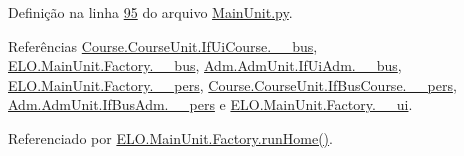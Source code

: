 Definição na linha \hyperlink{MainUnit_8py_source_l00095}{95} do arquivo \hyperlink{MainUnit_8py_source}{Main\-Unit.\-py}.



Referências \hyperlink{CourseUnit_8py_source_l00025}{Course.\-Course\-Unit.\-If\-Ui\-Course.\-\_\-\-\_\-bus}, \hyperlink{MainUnit_8py_source_l00039}{E\-L\-O.\-Main\-Unit.\-Factory.\-\_\-\-\_\-bus}, \hyperlink{AdmUnit_8py_source_l00067}{Adm.\-Adm\-Unit.\-If\-Ui\-Adm.\-\_\-\-\_\-bus}, \hyperlink{MainUnit_8py_source_l00040}{E\-L\-O.\-Main\-Unit.\-Factory.\-\_\-\-\_\-pers}, \hyperlink{CourseUnit_8py_source_l00051}{Course.\-Course\-Unit.\-If\-Bus\-Course.\-\_\-\-\_\-pers}, \hyperlink{AdmUnit_8py_source_l00112}{Adm.\-Adm\-Unit.\-If\-Bus\-Adm.\-\_\-\-\_\-pers} e \hyperlink{MainUnit_8py_source_l00038}{E\-L\-O.\-Main\-Unit.\-Factory.\-\_\-\-\_\-ui}.



Referenciado por \hyperlink{classELO_1_1MainUnit_1_1Factory_a766943202ba781821cf749ca0fb133ba}{E\-L\-O.\-Main\-Unit.\-Factory.\-run\-Home()}.


